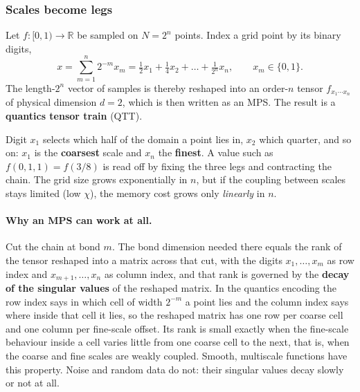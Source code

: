 \subsubsection{Scales become legs}

\begin{definition}
  Let $f : [0,1) \to \mathbb{R}$ be sampled on $N = 2^n$ points. Index a grid
  point by its binary digits,
  \begin{equation}
    x = \sum_{m=1}^{n} 2^{-m} x_m
      = \tfrac12 x_1 + \tfrac14 x_2 + \dots + \tfrac{1}{2^n} x_n,
    \qquad x_m \in \{0,1\}.
    \label{eq:quantics}
  \end{equation}%
  The length-$2^n$ vector of samples is thereby reshaped into an order-$n$
  tensor $f_{x_1 \cdots x_n}$ of physical dimension $d = 2$, which is then
  written as an MPS. The result is a \textbf{quantics tensor train} (QTT).
\end{definition}

Digit $x_1$ selects which half of the domain a point lies in, $x_2$ which
quarter, and so on: $x_1$ is the \textbf{coarsest} scale and $x_n$ the
\textbf{finest}. A value such as $f(0,1,1) = f(3/8)$ is read off by fixing the
three legs and contracting the chain. The grid size grows exponentially in $n$,
but if the coupling between scales stays limited (low $\chi$), the memory cost
grows only \emph{linearly} in $n$.

\paragraph{Why an MPS can work at all.}
Cut the chain at bond $m$. The bond dimension needed there equals the rank of
the tensor reshaped into a matrix across that cut, with the digits
$x_1,\dots,x_m$ as row index and $x_{m+1},\dots,x_n$ as column index, and that
rank is governed by the \textbf{decay of the singular values} of the reshaped
matrix. In the quantics encoding the row index says in which cell of width
$2^{-m}$ a point lies and the column index says where inside that cell it lies,
so the reshaped matrix has one row per coarse cell and one column per fine-scale
offset. Its rank is small exactly when the fine-scale behaviour inside a cell
varies little from one coarse cell to the next, that is, when the coarse and
fine scales are weakly coupled. Smooth, multiscale functions have this property.
Noise and random data do not: their singular values decay slowly or not at all.

